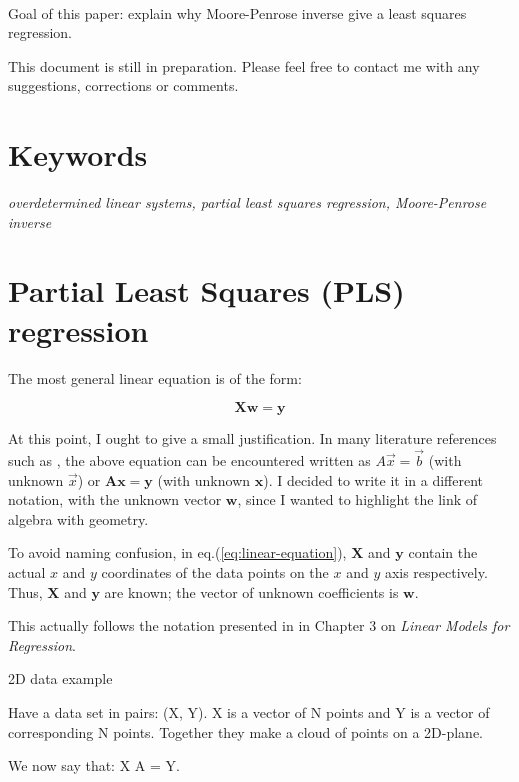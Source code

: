 \documentclass[10pt,twocolumn]{article}
\begin{document}
\,\,

Goal of this paper: explain why Moore-Penrose inverse give a least squares regression.
\,\,

This document is still in preparation. Please feel free to contact me with any suggestions, corrections or comments.

\section*{Keywords}

\textit{overdetermined linear systems, partial least squares regression, Moore-Penrose inverse}

\tableofcontents








\section{Partial Least Squares (PLS) regression}

The most general linear equation is of the form:

\begin{equation} \label{eq:linear-equation}
\bm{X} \bm{w} = \bm{y}
\end{equation}

At this point, I ought to give a small justification. In many literature references such as \cite{Strang}, the above equation can be encountered written as $A \vec{x} = \vec{b}$ (with unknown $\vec{x}$) or $\bm{A} \bm{x} = \bm{y}$ (with unknown $\bm{x}$). I decided to write it in a different notation, with the unknown vector $\bm{w}$, since I wanted to highlight the link of algebra with geometry.

To avoid naming confusion, in eq.(\ref{eq:linear-equation}), $\bm{X}$ and $\bm{y}$ contain the actual $x$ and $y$ coordinates of the data points on the $x$ and $y$ axis respectively. Thus, $\bm{X}$ and $\bm{y}$ are known; the vector of unknown coefficients is $\bm{w}$.

This actually follows the notation presented in \cite{Bishop} in Chapter 3 on \textit{Linear Models for Regression}.

2D data example

Have a data set in pairs: (X, Y). X is a vector of N points and Y is a vector of corresponding N points. Together they make a cloud of points on a 2D-plane.

We now say that: X A = Y.
\end{document}
